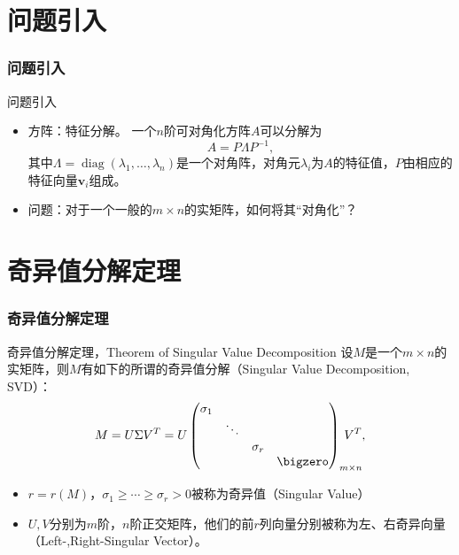 \section{问题引入} %
\begin{frame}
\frametitle{问题引入}

\begin{block}{问题引入}
\begin{itemize}
\item<1-> 方阵：特征分解。\newline
一个$n$阶可对角化方阵$A$可以分解为
$$A = P\Lambda P^{-1},$$
其中$\Lambda = \operatorname{diag}(\lambda_1,\ldots,\lambda_n)$是一个{\color{red}对角阵}，对角元$\lambda_i$为$A$的特征值，$P$由相应的特征向量$\mathbf{v}_i$组成。\newline

\item<2-> 问题：对于一个一般的$m\times n$的实矩阵，如何将其``对角化''？
\end{itemize}
\end{block}

\end{frame}


\section{奇异值分解定理} 


\begin{frame}
\frametitle{奇异值分解定理}

\begin{block}{奇异值分解定理，Theorem of Singular Value Decomposition}
设$M$是一个$m\times n$的实矩阵，则$M$有如下的所谓的奇异值分解（Singular Value Decomposition, SVD）：
$$M = U\Sigma V^T = U\begin{pmatrix}
\sigma_1 & & & \\ & \ddots & & \\ & & \sigma_r & \\ & & & \bigzero \end{pmatrix}_{m\times n}\!\!\!\!\!\!\!\!\!\! V^T,$$
\pause
\begin{itemize}
\item $r = r(M)$，$\sigma_1 \geqslant \cdots \geqslant \sigma_r > 0$被称为奇异值（Singular Value）
\item $U,V$分别为$m$阶，$n$阶正交矩阵，他们的前$r$列向量分别被称为左、右奇异向量（Left-,Right-Singular Vector）。
\end{itemize}
\end{block}

\end{frame}

